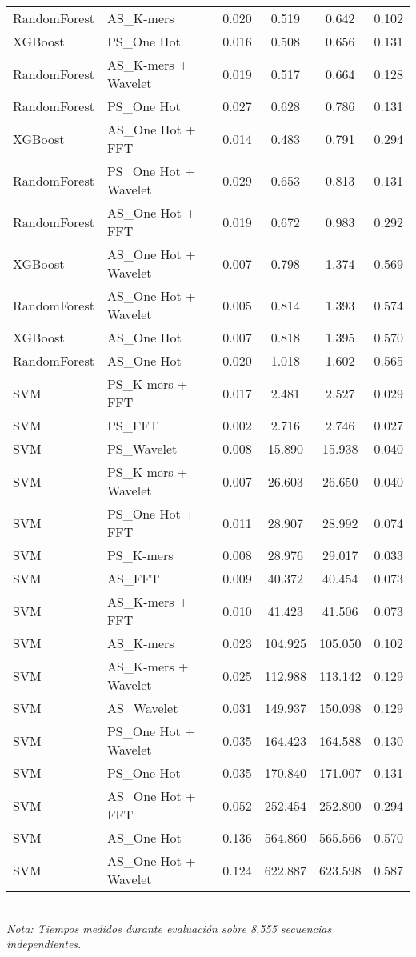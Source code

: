 \begin{table*}[htbp]
\begin{tabular}{llcccc}
RandomForest & AS\_K-mers & 0.020 & 0.519 & 0.642 & 0.102 \\
XGBoost & PS\_One Hot & 0.016 & 0.508 & 0.656 & 0.131 \\
RandomForest & AS\_K-mers + Wavelet & 0.019 & 0.517 & 0.664 & 0.128 \\
RandomForest & PS\_One Hot & 0.027 & 0.628 & 0.786 & 0.131 \\
XGBoost & AS\_One Hot + FFT & 0.014 & 0.483 & 0.791 & 0.294 \\
RandomForest & PS\_One Hot + Wavelet & 0.029 & 0.653 & 0.813 & 0.131 \\
RandomForest & AS\_One Hot + FFT & 0.019 & 0.672 & 0.983 & 0.292 \\
XGBoost & AS\_One Hot + Wavelet & 0.007 & 0.798 & 1.374 & 0.569 \\
RandomForest & AS\_One Hot + Wavelet & 0.005 & 0.814 & 1.393 & 0.574 \\
XGBoost & AS\_One Hot & 0.007 & 0.818 & 1.395 & 0.570 \\
RandomForest & AS\_One Hot & 0.020 & 1.018 & 1.602 & 0.565 \\
SVM & PS\_K-mers + FFT & 0.017 & 2.481 & 2.527 & 0.029 \\
SVM & PS\_FFT & 0.002 & 2.716 & 2.746 & 0.027 \\
SVM & PS\_Wavelet & 0.008 & 15.890 & 15.938 & 0.040 \\
SVM & PS\_K-mers + Wavelet & 0.007 & 26.603 & 26.650 & 0.040 \\
SVM & PS\_One Hot + FFT & 0.011 & 28.907 & 28.992 & 0.074 \\
SVM & PS\_K-mers & 0.008 & 28.976 & 29.017 & 0.033 \\
SVM & AS\_FFT & 0.009 & 40.372 & 40.454 & 0.073 \\
SVM & AS\_K-mers + FFT & 0.010 & 41.423 & 41.506 & 0.073 \\
SVM & AS\_K-mers & 0.023 & 104.925 & 105.050 & 0.102 \\
SVM & AS\_K-mers + Wavelet & 0.025 & 112.988 & 113.142 & 0.129 \\
SVM & AS\_Wavelet & 0.031 & 149.937 & 150.098 & 0.129 \\
SVM & PS\_One Hot + Wavelet & 0.035 & 164.423 & 164.588 & 0.130 \\
SVM & PS\_One Hot & 0.035 & 170.840 & 171.007 & 0.131 \\
SVM & AS\_One Hot + FFT & 0.052 & 252.454 & 252.800 & 0.294 \\
SVM & AS\_One Hot & 0.136 & 564.860 & 565.566 & 0.570 \\
SVM & AS\_One Hot + Wavelet & 0.124 & 622.887 & 623.598 & 0.587 \\
\bottomrule
\end{tabular}
\\[0.5em]
\footnotesize
\textit{Nota: Tiempos medidos durante evaluación sobre 8,555 secuencias independientes.}
\end{table*}